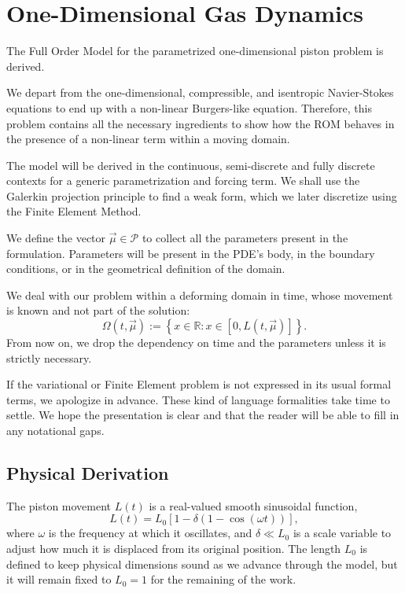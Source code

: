 \documentclass[../../thesis.tex]{subfiles}
\begin{document}
\section{One-Dimensional Gas Dynamics}
\label{sec:fom_definition}
The Full Order Model for the parametrized one-dimensional piston problem is derived.

We depart from the one-dimensional, compressible, and isentropic \mbox{Navier-Stokes} equations to end up with a non-linear Burgers-like equation.
Therefore, this problem contains all the necessary ingredients to show how the ROM behaves 
in the presence of a non-linear term within a moving domain.

The model will be derived in the continuous, semi-discrete and fully discrete contexts for a generic parametrization and forcing term.
We shall use the Galerkin projection principle to find a weak form, which we later discretize using the Finite Element Method. 

We define the vector $\vec{\mu} \in \mathcal{P}$ to collect all the parameters present in the formulation.
Parameters will be present in the PDE's body, in the boundary conditions, or in the geometrical definition of the domain. 

We deal with our problem within a deforming domain in time, whose movement is known and not part of the solution:
\begin{equation*}
    \Omega(t, \vec{\mu}) := \left\{x \in \mathbb{R} : x \in \left[0, L(t, \vec{\mu})\right]\right\}.
\end{equation*}
From now on, we drop the dependency on time and the parameters unless it is strictly necessary. 

If the variational or Finite Element problem is not expressed in its usual formal terms, we apologize in advance.
These kind of language formalities take time to settle.
We hope the presentation is clear and that the reader will be able to fill in any notational gaps. 

\subsection{Physical Derivation}
The piston movement $L(t)$ is a real-valued smooth sinusoidal function,
\begin{equation}
    L(t) = L_0 \left[1 - \delta \left(1 - \cos \left(\omega t\right)\right)\right],
\end{equation}
where $\omega$ is the frequency at which it oscillates, 
and $\delta \ll L_0$ is a scale variable to adjust how much it is displaced from its original position.
The length $L_0$ is defined to keep physical dimensions sound as we advance through the model, 
but it will remain fixed to $L_0=1$ for the remaining of the work.
\end{document}
